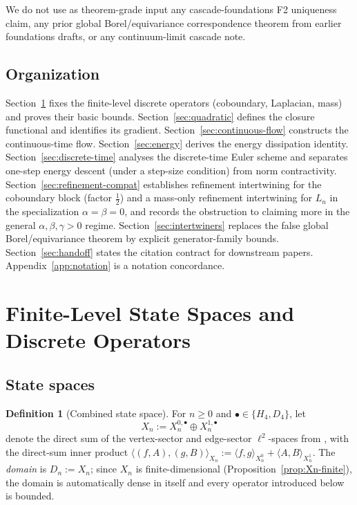 \documentclass[11pt, a4paper]{amsart}
\theoremstyle{definition}
\newtheorem{definition}[theorem]{Definition}
\begin{document}
We do not use as theorem-grade input any cascade-foundations F2
uniqueness claim, any prior global Borel/equivariance correspondence
theorem from earlier foundations drafts, or any continuum-limit
cascade note.

\subsection{Organization}

Section~\ref{sec:operators} fixes the finite-level discrete
operators (coboundary, Laplacian, mass) and proves their basic
bounds. Section~\ref{sec:quadratic} defines the closure functional
and identifies its gradient. Section~\ref{sec:continuous-flow}
constructs the continuous-time flow. Section~\ref{sec:energy}
derives the energy dissipation identity.
Section~\ref{sec:discrete-time} analyses the discrete-time Euler
scheme and separates one-step energy descent (under a step-size
condition) from norm contractivity.
Section~\ref{sec:refinement-compat} establishes refinement
intertwining for the coboundary block (factor $\tfrac{1}{2}$)
and a mass-only refinement intertwining for $L_n$ in the
specialization $\alpha = \beta = 0$, and records the obstruction
to claiming more in the general $\alpha, \beta, \gamma > 0$
regime. Section~\ref{sec:intertwiners} replaces the false
global Borel/equivariance theorem by explicit generator-family
bounds. Section~\ref{sec:handoff} states the citation contract for
downstream papers. Appendix~\ref{app:notation} is a notation
concordance.

\section{Finite-Level State Spaces and Discrete Operators}
\label{sec:operators}

\subsection{State spaces}

\begin{definition}[Combined state space]
\label{def:Xn}
For $n \geq 0$ and $\bullet \in \{H_4, D_4\}$, let
\[
  X_n := X_n^{0, \bullet} \oplus X_n^{1, \bullet}
\]
denote the direct sum of the vertex-sector and edge-sector
$\ell^2$-spaces from
\cite[Definitions~\texttt{def:Xn-0} and~\texttt{def:Xn-1}]{RefinementSpaces}, with
the direct-sum inner product
$\langle (f, A), (g, B) \rangle_{X_n} := \langle f, g
\rangle_{X_n^0} + \langle A, B \rangle_{X_n^1}$.
The \emph{domain} is $D_n := X_n$; since $X_n$ is
finite-dimensional (Proposition~\ref{prop:Xn-finite}), the domain
is automatically dense in itself and every operator introduced
below is bounded.
\end{definition}
\end{document}
